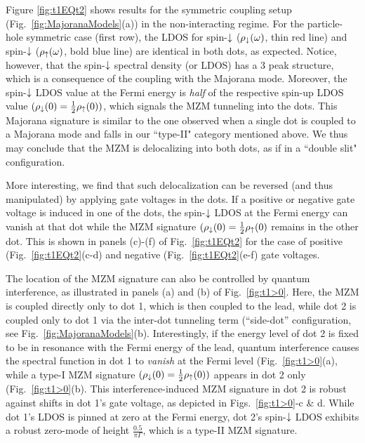 \documentclass[showpacs,aps,prb,reprint,superscriptaddress]{revtex4-2}
\begin{document}


    
     Figure \ref{fig:t1EQt2} shows results for the symmetric coupling setup (Fig.\ \ref{fig:MajoranaModels}(a)) in the non-interacting regime. For the particle-hole symmetric case (first row), the LDOS for spin-$\downarrow$ ($\rho_\downarrow(\omega)$, thin red line) and spin-$\downarrow$ ($\rho_\uparrow(\omega)$, bold blue line) are identical in both dots, as expected. Notice, however, that the  spin-$\downarrow$ spectral density (or LDOS) has a 3 peak structure, which is a consequence of the coupling with the Majorana mode. Moreover, the spin-$\downarrow$ LDOS value at the Fermi energy is \textit{half} of the respective spin-up LDOS value $(\rho_\downarrow(0) = \frac{1}{2}\rho_\uparrow(0))$, which signals the MZM tunneling into the dots. This Majorana signature is similar to the one observed when a single dot is coupled to a Majorana mode \cite{liu_detecting_2011,vernek_subtle_2014} and falls in our ``type-II" category mentioned above.  We thus may conclude that the MZM is delocalizing into both dots, as if in a ``double slit" configuration. 

More interesting, we find that such delocalization can be reversed (and thus manipulated) by applying gate voltages in the dots. If a positive or negative gate voltage is induced in one of the dots, the spin-$\downarrow$ LDOS at the Fermi energy can vanish at that dot while the MZM signature $(\rho_\downarrow(0) = \frac{1}{2}\rho_\uparrow(0)$ remains in the other dot. This is shown in panels (c)-(f) of Fig.\ \ref{fig:t1EQt2} for the case of positive (Fig.\ \ref{fig:t1EQt2}(c-d) and negative (Fig.\ \ref{fig:t1EQt2}(e-f) gate voltages. 
%


    The location of the MZM signature can also be controlled by quantum interference, as illustrated in panels (a) and (b) of Fig.\ \ref{fig:t1>0}. Here, the MZM is coupled directly only to dot 1, which is then coupled to the lead, while dot 2 is coupled only to dot 1 via the inter-dot tunneling term (``side-dot'' configuration, see Fig.\ \ref{fig:MajoranaModels}(b). Interestingly, if the energy level of dot 2 is fixed to be in resonance with the Fermi energy of the lead, quantum interference causes the spectral function in dot 1 to \textit{vanish} at the Fermi level (Fig.\ \ref{fig:t1>0}(a), while a type-I MZM signature $(\rho_\downarrow(0) = \frac{1}{2}\rho_\uparrow(0))$ appears in dot 2 only (Fig.\ \ref{fig:t1>0}(b). This interference-induced MZM signature in dot 2 is robust against shifts in dot 1's gate voltage, as depicted in Figs.\ \ref{fig:t1>0}-c \& d.  While dot 1's LDOS is pinned at zero at the Fermi energy, dot 2's spin-$\downarrow$ LDOS exhibits a robust zero-mode of height $\frac{0.5}{\pi \Gamma}$, which is a type-II MZM signature. 
\end{document}
